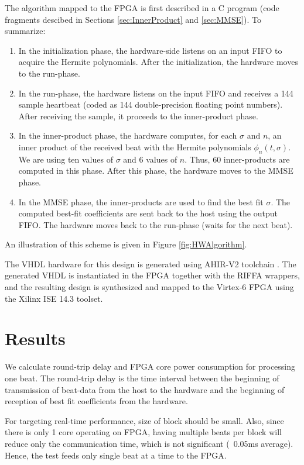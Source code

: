 \documentclass[runningheads]{llncs}
\begin{document}
The algorithm mapped to the FPGA 
is first described in a C program (code fragments descibed in Sections \ref{sec:InnerProduct} and \ref{sec:MMSE}).
To summarize:
\begin{enumerate}
\item In the initialization phase, the hardware-side listens on an input FIFO to acquire
the Hermite polynomials.  After the initialization, the hardware moves to the run-phase.
\item In the run-phase, the hardware listens on the input FIFO and receives a 144 sample
heartbeat (coded as 144 double-precision floating point numbers).  After receiving
the sample, it proceeds to the inner-product phase.
\item In the inner-product phase, the hardware computes, for each $\sigma$ and
$n$, an inner product of the received beat with the Hermite polynomials $\phi_n(t,\sigma)$.
We are using ten values of $\sigma$ and $6$ values of $n$.  Thus, 60 inner-products
are computed in this phase.  After this phase, the hardware moves to the MMSE
phase.
\item  In the MMSE phase, the inner-products are used to find the best fit $\sigma$.
The computed best-fit coefficients are sent back to the host using the output FIFO.
The hardware moves back to the run-phase (waits for the next beat).
\end{enumerate}
An illustration of this scheme is given in Figure \ref{fig:HWAlgorithm}.

The VHDL hardware for this design is generated using AHIR-V2 toolchain \cite{c:ahir_usenix2012}.  
The generated VHDL is instantiated in the FPGA together with the RIFFA wrappers,
and the resulting design is synthesized and mapped to the Virtex-6 FPGA using
the Xilinx ISE 14.3 toolset.


%
\section{Results}\label{s:results}

We calculate round-trip delay and FPGA core power consumption for processing one beat. 
The round-trip delay is the time interval between the beginning of transmission of 
beat-data from the host to the hardware and the beginning of reception of best fit
coefficients from the hardware. 

For targeting real-time performance, size of block should be small. Also, since there 
is only 1 core operating on FPGA, having multiple beats per block will reduce only the 
communication time, which is not significant (~0.05ms average). Hence, the test feeds 
only single beat at a time to the FPGA.
\end{document}
